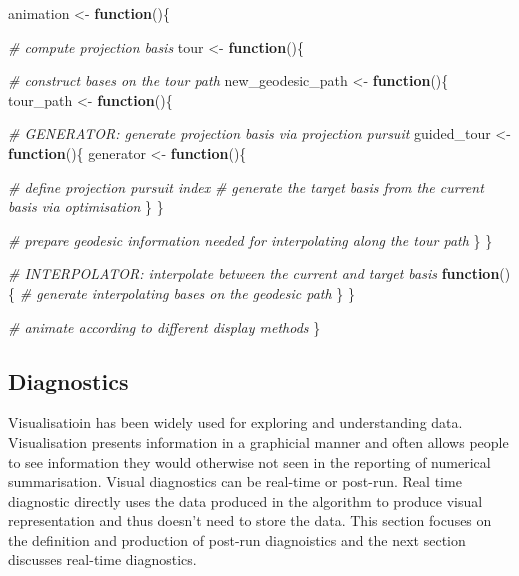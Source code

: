 \documentclass[12pt]{article}
\newenvironment{Shaded}{\begin{snugshade}}{\end{snugshade}}
\newcommand{\CommentTok}[1]{\textcolor[rgb]{0.56,0.35,0.01}{\textit{#1}}}
\newcommand{\ControlFlowTok}[1]{\textcolor[rgb]{0.13,0.29,0.53}{\textbf{#1}}}
\newcommand{\NormalTok}[1]{#1}
\newcommand{\StringTok}[1]{\textcolor[rgb]{0.31,0.60,0.02}{#1}}
\begin{document}
\begin{Shaded}
\begin{Highlighting}[]
\NormalTok{animation <-}\StringTok{ }\ControlFlowTok{function}\NormalTok{()\{}
  
  \CommentTok{# compute projection basis }
\NormalTok{  tour <-}\StringTok{ }\ControlFlowTok{function}\NormalTok{()\{}
    
    \CommentTok{# construct bases on the tour path}
\NormalTok{    new_geodesic_path <-}\StringTok{ }\ControlFlowTok{function}\NormalTok{()\{}
\NormalTok{      tour_path <-}\StringTok{ }\ControlFlowTok{function}\NormalTok{()\{}
        
        \CommentTok{# GENERATOR: generate projection basis via projection pursuit}
\NormalTok{        guided_tour <-}\StringTok{ }\ControlFlowTok{function}\NormalTok{()\{}
\NormalTok{          generator <-}\StringTok{ }\ControlFlowTok{function}\NormalTok{()\{}
            
            \CommentTok{# define projection pursuit index}
            \CommentTok{# generate the target basis from the current basis via optimisation}
\NormalTok{          \}}
\NormalTok{        \}}
        
        \CommentTok{# prepare geodesic information needed for interpolating along the tour path}
\NormalTok{      \}}
\NormalTok{    \}}
    
    \CommentTok{# INTERPOLATOR: interpolate between the current and target basis }
    \ControlFlowTok{function}\NormalTok{()\{}
      \CommentTok{# generate interpolating bases on the geodesic path}
\NormalTok{    \}}
\NormalTok{  \}}
  
  \CommentTok{# animate according to different display methods}
\NormalTok{\}}
\end{Highlighting}
\end{Shaded}

\hypertarget{diagnostics}{%
\subsection{Diagnostics}\label{diagnostics}}

Visualisatioin has been widely used for exploring and understanding
data. Visualisation presents information in a graphicial manner and
often allows people to see information they would otherwise not seen in
the reporting of numerical summarisation. Visual diagnostics can be
real-time or post-run. Real time diagnostic directly uses the data
produced in the algorithm to produce visual representation and thus
doesn't need to store the data. This section focuses on the definition
and production of post-run diagnoistics and the next section discusses
real-time diagnostics.
\end{document}
